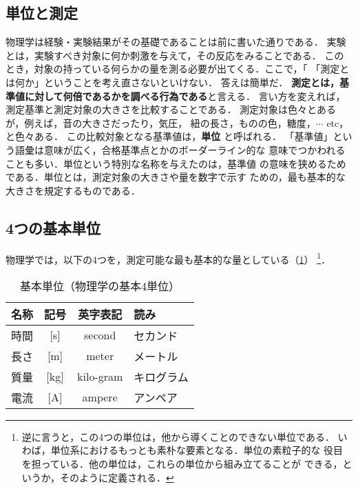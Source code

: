         \subsection{単位と測定}
            物理学は経験・実験結果がその基礎であることは前に書いた通りである．
            実験とは，実験すべき対象に何か刺激を与えて，その反応をみることである．
            このとき，対象の持っている何らかの量を測る必要が出てくる．ここで，「
            「測定とは何か」ということを考え直さないといけない．
            答えは簡単だ．
            \textbf{測定とは，基準値に対して何倍であるかを調べる行為である}と言える．
            言い方を変えれば，測定基準と測定対象の大きさを比較することである．
            測定対象は色々とあるが，例えば，音の大きさだったり，気圧，
            紐の長さ，ものの色，糖度，$\cdots$ etc，と色々ある．
            この比較対象となる基準値は，\textbf{単位} と呼ばれる．
            「基準値」という語彙は意味が広く，合格基準点とかのボーダーライン的な
            意味でつかわれることも多い．単位という特別な名称を与えたのは，基準値
            の意味を狭めるためである．単位とは，測定対象の大きさや量を数字で示す
            ための，最も基本的な大きさを規定するものである．

        \subsection{4つの基本単位}
            物理学では，以下の4つを，測定可能な最も基本的な量としている（\Table\ref{table:f4unit}）
            \footnote{
                逆に言うと，この4つの単位は，他から導くことのできない単位である．
                いわば，単位系におけるもっとも素朴な要素となる．単位の素粒子的な
                役目を担っている．他の単位は，これらの単位から組み立てることが
                できる，というか，そのように定義される．
            }．
                \begin{table}[htb]
                  \centering
                  \caption{基本単位（物理学の基本4単位）}
                  \begin{tabular}{|l|c|c|l|}                  \hline
                    名称 & 記号   & 英字表記  & 読み       \\ \hline  \hline
                    時間 & [s]    & second    & セカンド   \\ \hline
                    長さ & [m]    & meter     & メートル   \\ \hline
                    質量 & [kg]   & kilo-gram & キログラム \\ \hline
                    電流 & [A]    & ampere    & アンペア   \\ \hline
                  \end{tabular}
                  \label{table:f4unit}
                \end{table}

